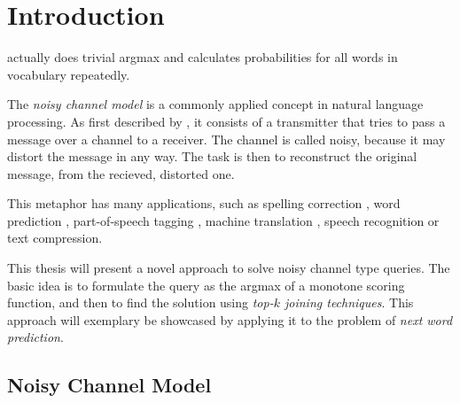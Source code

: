 \chapter{Introduction}
\label{ch:introduction}

\begin{draft}
\textcite{Bickel2005} actually does trivial argmax and calculates probabilities
for all words in vocabulary repeatedly.
\end{draft}

The \emph{noisy channel model} is a commonly applied concept in natural language
processing.
As first described by \textcite{Shannon1948}, it consists of a transmitter that
tries to pass a message over a channel to a receiver.
The channel is called noisy, because it may distort the message in any way.
The task is then to reconstruct the original message, from the recieved,
distorted one.

This metaphor has many applications, such as spelling correction
\parencite{JurafskyMartin2009,Manning2008,Kernighan1990,Mays1991},
word prediction \parencite{Bickel2005}, part-of-speech tagging
\parencite{Church1988}, machine translation \parencite{Brown1990}, speech
recognition or text compression.

This thesis will present a novel approach to solve noisy channel type queries.
The basic idea is to formulate the query as the argmax of a monotone scoring
function, and then to find the solution using \emph{top-$k$ joining techniques}.
This approach will exemplary be showcased by applying it to the problem of
\emph{next word prediction}.

\section{Noisy Channel Model}

